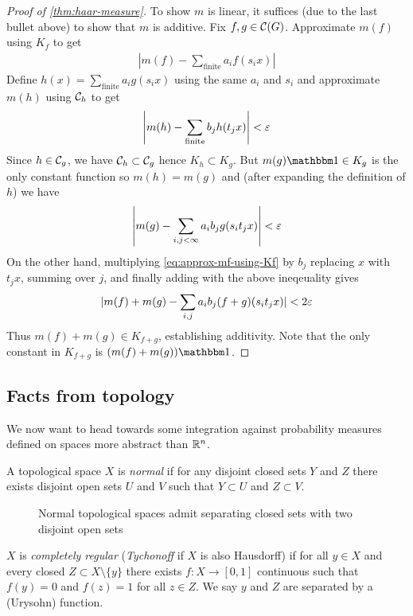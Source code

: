 \begin{proof}[Proof of \cref{thm:haar-measure}]
  To show $m$ is linear, it suffices (due to the last bullet above) to show
  that $m$ is additive. Fix $f,g \in \mathcal{C}(G)$. Approximate $m(f)$
  using $K_f$ to get
  \begin{align}
    \label{eq:approx-mf-using-Kf}
    \left\lvert m(f) - \sum_{\mathrm{finite}} a_i f(s_i x) \right\rvert
  \end{align}
  Define $h(x) = \sum_{\mathrm{finite}} a_i g(s_i x)$ using the same $a_i$
  and $s_i$ and approximate $m(h)$ using $\mathcal{C}_h$ to get
  \[
    \left\lvert m(h) - \sum_{\mathrm{finite}} b_j h(t_j x) \right\rvert < \varepsilon
  \]
  Since $h \in \mathcal{C}_g$, we have $\mathcal{C}_h
  \subset \mathcal{C}_g$ hence $K_h \subset K_g$. But $m(g) \ind \in K_g$ is the only
  constant function so $m(h) = m(g)$ and (after expanding the definition of $h$)
  we have
  \[
    \left\lvert m(g) - \sum_{i,j < \infty} a_i b_j g(s_i t_j x) \right\rvert < \varepsilon
  \]
  On the other hand, multiplying \cref{eq:approx-mf-using-Kf} by $b_j$
  replacing $x$ with $t_j x$, summing over $j$, and finally adding with
  the above ineqeuality gives
  \[
    \lvert m(f) + m(g) - \sum_{i,j} a_i b_j (f + g) (s_i t_j x) \rvert < 2 \varepsilon
  \]
  Thus $m(f) + m(g) \in K_{f+g}$, establishing additivity.
  Note that the only constant in $K_{f+g}$ is $(m(f) + m(g))\ind$.
\end{proof}

\subsection{Facts from topology}

We now want to head towards some integration against probability measures
defined on spaces more abstract than $\mathbb{R}^n$.


\begin{definition}
  A topological space $X$ is \emph{normal} if for any disjoint closed
  sets $Y$ and $Z$ there exists disjoint open sets $U$ and $V$
  such that $Y \subset U$ and $Z \subset V$.
\end{definition}

\begin{figure}[ht]
  \centering
  \caption{Normal topological spaces admit separating closed
  sets with two disjoint open sets}
  \label{fig:normal-topological-space}
\end{figure}

\begin{definition}
  $X$ is \emph{completely regular} (\emph{Tychonoff} if $X$ is also Hausdorff)
  if for all $y \in X$ and every closed $Z \subset X \setminus \{y\}$ there
  exists $f : X \to [0,1]$ continuous such that $f(y) = 0$ and $f(z) = 1$ for
  all $z \in Z$.
  We say $y$ and $Z$ are separated by a (Urysohn) function.
\end{definition}

